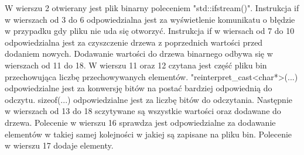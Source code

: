 W wierszu 2 otwierany jest plik binarny poleceniem "std::ifstream()".
Instrukcja if w wierszach od 3 do 6 odpowiedzialna jest za wyświetlenie komunikatu o błędzie w przypadku gdy pliku nie uda się otworzyć.
Instrukcja if w wiersach od 7 do 10 odpowiedzialna jest za czyszczenie drzewa z poprzednich wartości przed dodaniem nowych.
Dodawanie wartości do drzewa binarnego odbywa się w wierszach od 11 do 18.
W wierszu 11 oraz 12 czytana jest część pliku bin przechowująca liczbę przechowywanych elementów. "reinterpret\_cast<char*>(...) odpowiedzialne jest za konwersję bitów na postać bardziej odpowiednią do odczytu. sizeof(...) odpowiedzialne jest za liczbę bitów do odczytania.
Następnie w wierszach od 13 do 18 sczytywane są wszystkie wartości oraz dodawane do drzewa. Polecenie w wierszu 16 sprawdza jest odpowiedzialne za dodawanie elementów w takiej samej kolejności w jakiej są zapisane na pliku bin. Polecenie w wierszu 17 dodaje elementy.

